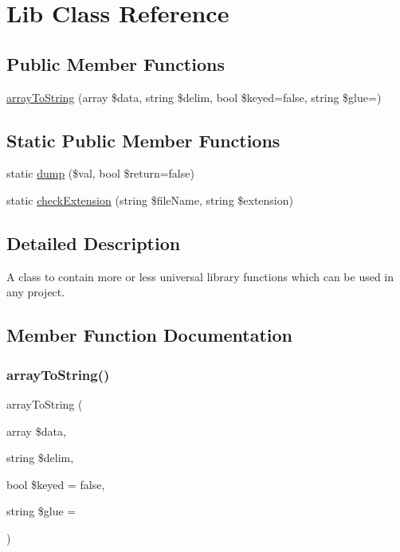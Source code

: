 \hypertarget{class_lib}{}\section{Lib Class Reference}
\label{class_lib}
\subsection*{Public Member Functions}
\begin{DoxyCompactItemize}
\item 
\hyperlink{class_lib_a792f12586807e89f69e34b7392d6417d}{array\+To\+String} (array \$data, string \$delim, bool \$keyed=false, string \$glue=\textquotesingle{}\textquotesingle{})
\end{DoxyCompactItemize}
\subsection*{Static Public Member Functions}
\begin{DoxyCompactItemize}
\item 
static \hyperlink{class_lib_a29c2b6b4cde743c320b8a9e30056a6dd}{dump} (\$val, bool \$return=false)
\item 
static \hyperlink{class_lib_ab5fbdf394f09fcef4dcea271c344cb65}{check\+Extension} (string \$file\+Name, string \$extension)
\end{DoxyCompactItemize}


\subsection{Detailed Description}
A class to contain more or less universal library functions which can be used in any project. 

\subsection{Member Function Documentation}
\mbox{\label{class_lib_a792f12586807e89f69e34b7392d6417d}} 
\subsubsection{\texorpdfstring{array\+To\+String()}{arrayToString()}}
{\footnotesize\ttfamily array\+To\+String (\begin{DoxyParamCaption}\item[{array}]{\$data,  }\item[{string}]{\$delim,  }\item[{bool}]{\$keyed = {\ttfamily false},  }\item[{string}]{\$glue = {\ttfamily \textquotesingle{}\textquotesingle{}} }\end{DoxyParamCaption})}

